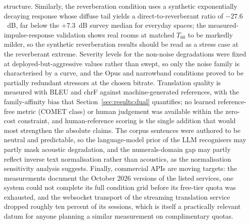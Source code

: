 structure. Similarly, the reverberation condition uses a synthetic
exponentially decaying response whose diffuse tail yields a
direct-to-reverberant ratio of $-27.6$~dB, far below the $+7.3$~dB survey
median for everyday spaces; the measured-impulse-response validation
shows real rooms at matched $T_{60}$ to be markedly milder, so the
synthetic reverberation results should be read as a stress case at the
reverberant extreme. Severity levels
for the non-noise degradations were fixed at deployed-but-aggressive values
rather than swept, so only the noise family is characterised by a curve,
and the Opus and narrowband conditions proved to be partially redundant
stressors at the chosen bitrate. Translation quality is measured with BLEU
and chrF against machine-generated references, with the family-affinity
bias that Section~\ref{sec:results:dual} quantifies; no learned
reference-free metric (COMET class) or human judgement was available within
the zero-cost constraint, and human-reference scoring is the single
addition that would most strengthen the absolute claims. The corpus
sentences were authored to be neutral and predictable, so the language-model
prior of the LLM recognisers may partly mask acoustic degradation, and the
numerals-domain gap may partly reflect inverse text normalisation rather
than acoustics, as the normalisation sensitivity analysis suggests.
Finally, commercial APIs are moving targets: the
measurements document the October 2026 versions of the listed services, one
system could not complete its full condition grid before its
free-tier quota was exhausted, and the websocket transport of the streaming
translation service dropped roughly ten percent of its sessions, which is
itself a practically relevant datum
for anyone planning a similar measurement on complimentary quotas.

